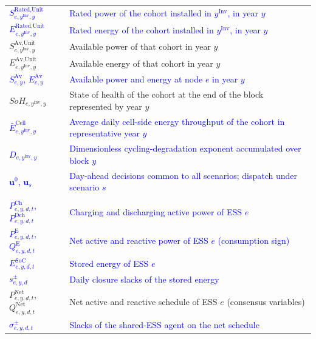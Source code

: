 \documentclass[preprint,12pt]{elsarticle}
\begin{document}
\begin{longtable}{@{}>{\raggedright\arraybackslash}p{} >{\raggedright\arraybackslash}p{}@{}}
        \textcolor{blue}{$S^{\text{Rated,Unit}}_{e,y^\text{Inv},y}$} & \textcolor{blue}{Rated power of the cohort installed in $y^\text{Inv}$, in year $y$} \\
        \textcolor{blue}{$E^{\text{Rated,Unit}}_{e,y^\text{Inv},y}$} & \textcolor{blue}{Rated energy of the cohort installed in $y^\text{Inv}$, in year $y$} \\
        $S^{\text{Av,Unit}}_{e,y^\text{Inv},y}$ & Available power of that cohort in year $y$ \\
        $E^{\text{Av,Unit}}_{e,y^\text{Inv},y}$ & Available energy of that cohort in year $y$ \\
        \textcolor{blue}{$S^{\text{Av}}_{e,y}$, $E^{\text{Av}}_{e,y}$} & \textcolor{blue}{Available power and energy at node $e$ in year $y$} \\
        $SoH_{e,y^\text{Inv},y}$ & State of health of the cohort at the end of the block represented by year $y$ \\
        \textcolor{blue}{$\bar{E}^{\text{Cell}}_{e,y^\text{Inv},y}$} & \textcolor{blue}{Average daily cell-side energy throughput of the cohort in representative year $y$} \\
        \textcolor{blue}{$D_{e,y^\text{Inv},y}$} & \textcolor{blue}{Dimensionless cycling-degradation exponent accumulated over block $y$} \\        
        \textcolor{blue}{$\boldsymbol{u}^{0}$, $\boldsymbol{u}_s$} & \textcolor{blue}{Day-ahead decisions common to all scenarios; dispatch under scenario $s$} \\
        \midrule
        \multicolumn{2}{@{}l}{\textbf{Operation}}\\*
        \textcolor{blue}{$P^{\text{Ch}}_{e,y,d,t}$, $P^{\text{Dch}}_{e,y,d,t}$} & \textcolor{blue}{Charging and discharging active power of ESS $e$} \\
        \textcolor{blue}{$P^{\text{E}}_{e,y,d,t}$, $Q^{\text{E}}_{e,y,d,t}$} & \textcolor{blue}{Net active and reactive power of ESS $e$ (consumption sign)} \\
        \textcolor{blue}{$E^{\text{SoC}}_{e,y,d,t}$} & \textcolor{blue}{Stored energy of ESS $e$} \\
        \textcolor{blue}{$s^{\pm}_{e,y,d}$} & \textcolor{blue}{Daily closure slacks of the stored energy} \\
        $P^{\text{Net}}_{e,y,d,t}$, $Q^{\text{Net}}_{e,y,d,t}$ & Net active and reactive schedule of ESS $e$ (consensus variables) \\
        \textcolor{blue}{$\sigma^{\pm}_{e,y,d,t}$} & \textcolor{blue}{Slacks of the shared-ESS agent on the net schedule} \\

\end{longtable}
\end{document}
